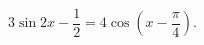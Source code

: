\begin{ex}[type=equation]
	\begin{condition}
		$\ 3\sin 2x -\dfrac{1}{2} = 4\cos{\left(x - \dfrac{\pi}{4}\right)}. $
	\end{condition}
\end{ex}